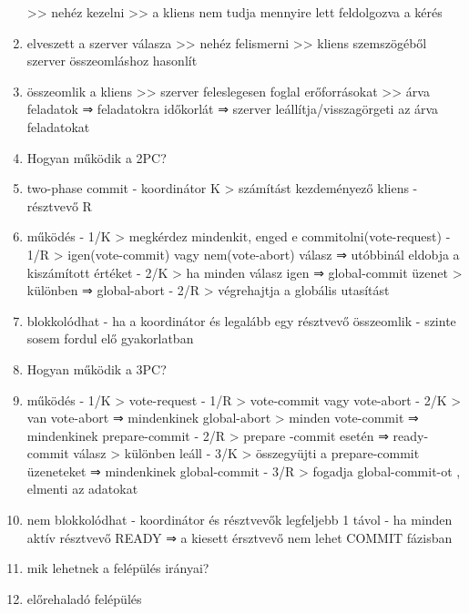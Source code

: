 \documentclass[twoside, a4paper, 12pt]{article}
\begin{document}
\begin{enumerate}
                >> nehéz kezelni >> a kliens nem tudja mennyire lett feldolgozva a kérés
            \item elveszett a szerver válasza
                >> nehéz felismerni >> kliens szemszögéből szerver összeomláshoz hasonlít
            \item összeomlik a kliens
                >> szerver feleslegesen foglal erőforrásokat >> árva feladatok
                ⇒ feladatokra időkorlát
                ⇒ szerver leállítja/visszagörgeti az árva feladatokat
            \item  Hogyan működik a 2PC?
            \item two-phase commit
                - koordinátor K 
                > számítást kezdeményező kliens
                - résztvevő R
            \item működés
                - 1/K
                > megkérdez mindenkit, enged e commitolni(vote-request)
                - 1/R
                > igen(vote-commit) vagy nem(vote-abort) válasz ⇒ utóbbinál eldobja a kiszámított értéket
                - 2/K
                > ha minden válasz igen ⇒ global-commit üzenet
                > különben ⇒ global-abort
                - 2/R
                > végrehajtja a globális utasítást
            \item blokkolódhat
                - ha a koordinátor és legalább egy résztvevő összeomlik
                - szinte sosem fordul elő gyakorlatban
            \item  Hogyan működik a 3PC?
            \item működés
                - 1/K
                > vote-request
                - 1/R
                > vote-commit vagy vote-abort
                - 2/K
                > van vote-abort ⇒ mindenkinek global-abort 
                > minden vote-commit ⇒ mindenkinek prepare-commit
                - 2/R
                > prepare -commit esetén ⇒ ready-commit válasz
                > különben leáll 
                - 3/K
                > összegyüjti a prepare-commit üzeneteket ⇒ mindenkinek global-commit
                - 3/R
                > fogadja global-commit-ot , elmenti az adatokat
            \item nem blokkolódhat
                - koordinátor és résztvevők legfeljebb 1 távol
                - ha minden aktív résztvevő READY ⇒ a kiesett érsztvevő nem lehet COMMIT fázisban
            \item  mik lehetnek a felépülés irányai?
            \item előrehaladó felépülés

\end{enumerate}
\end{document}
